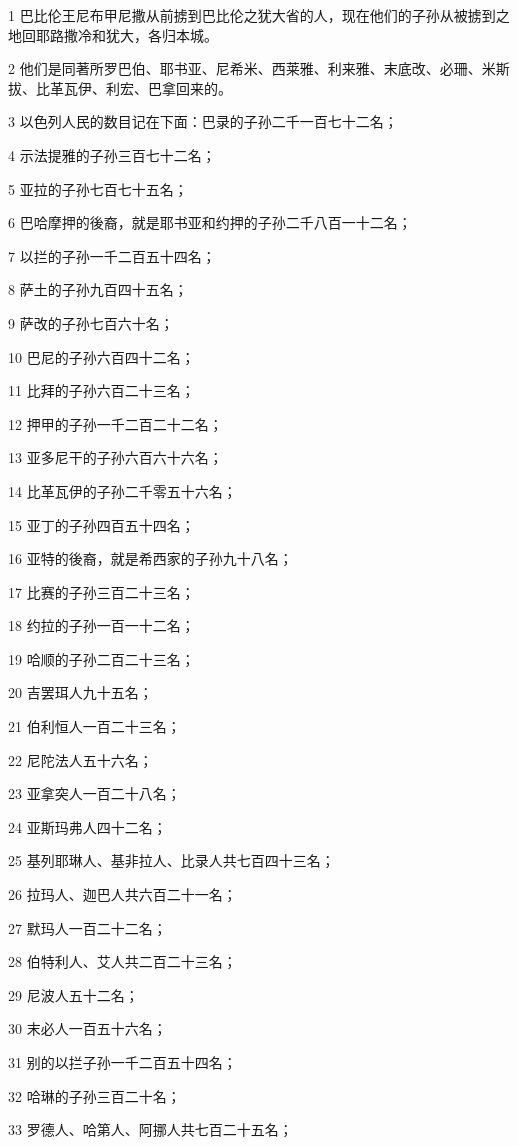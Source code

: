 \par 1 巴比伦王尼布甲尼撒从前掳到巴比伦之犹大省的人，现在他们的子孙从被掳到之地回耶路撒冷和犹大，各归本城。
\par 2 他们是同著所罗巴伯、耶书亚、尼希米、西莱雅、利来雅、末底改、必珊、米斯拔、比革瓦伊、利宏、巴拿回来的。
\par 3 以色列人民的数目记在下面：巴录的子孙二千一百七十二名；
\par 4 示法提雅的子孙三百七十二名；
\par 5 亚拉的子孙七百七十五名；
\par 6 巴哈摩押的後裔，就是耶书亚和约押的子孙二千八百一十二名；
\par 7 以拦的子孙一千二百五十四名；
\par 8 萨土的子孙九百四十五名；
\par 9 萨改的子孙七百六十名；
\par 10 巴尼的子孙六百四十二名；
\par 11 比拜的子孙六百二十三名；
\par 12 押甲的子孙一千二百二十二名；
\par 13 亚多尼干的子孙六百六十六名；
\par 14 比革瓦伊的子孙二千零五十六名；
\par 15 亚丁的子孙四百五十四名；
\par 16 亚特的後裔，就是希西家的子孙九十八名；
\par 17 比赛的子孙三百二十三名；
\par 18 约拉的子孙一百一十二名；
\par 19 哈顺的子孙二百二十三名；
\par 20 吉罢珥人九十五名；
\par 21 伯利恒人一百二十三名；
\par 22 尼陀法人五十六名；
\par 23 亚拿突人一百二十八名；
\par 24 亚斯玛弗人四十二名；
\par 25 基列耶琳人、基非拉人、比录人共七百四十三名；
\par 26 拉玛人、迦巴人共六百二十一名；
\par 27 默玛人一百二十二名；
\par 28 伯特利人、艾人共二百二十三名；
\par 29 尼波人五十二名；
\par 30 末必人一百五十六名；
\par 31 别的以拦子孙一千二百五十四名；
\par 32 哈琳的子孙三百二十名；
\par 33 罗德人、哈第人、阿挪人共七百二十五名；

